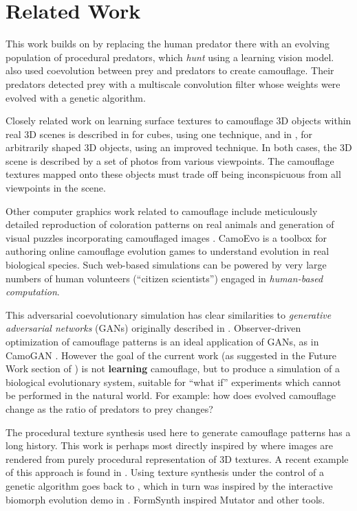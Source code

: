 \documentclass[letterpaper]{article}
\newcommand{\jargon}[1]{\textit{#1}}
\begin{document}
\section{Related Work}
This work builds on \citet{reynolds_iec_2011} by replacing the human predator there with an evolving population of procedural predators, which \jargon{hunt} using a learning vision model. \citet{harrington_coevolution_2014} also used coevolution between prey and predators to create camouflage. Their predators detected prey with a multiscale convolution filter whose weights were evolved with a genetic algorithm.
\par
Closely related work on learning surface textures to camouflage 3D objects within real 3D scenes is described in \citet{owens_camouflaging_2014} for cubes, using one technique, and in \citet{guo_ganmouflage_2022}, for arbitrarily shaped 3D objects, using an improved technique. In both cases, the 3D scene is described by a set of photos from various viewpoints. The camouflage textures mapped onto these objects must trade off being inconspicuous from all viewpoints in the scene.
\par
Other computer graphics work related to camouflage include meticulously detailed reproduction of coloration patterns on real animals \cite{de_gomensoro_malheiros_leopard_2020} and generation of visual puzzles incorporating camouflaged images \cite{chu_camo_image_2010} \cite{Zhang_Yin_Nie_Zheng_2020}. CamoEvo \cite{hancock_camoevo_2022} is a toolbox for authoring online camouflage evolution games to understand evolution in real biological species. Such web-based simulations can be powered by very large numbers of human volunteers (“citizen scientists”) engaged in \jargon{human-based computation}.
\par
This adversarial coevolutionary simulation has clear similarities to \jargon{generative adversarial networks} (GANs) originally described in \citet{goodfellow_gan_2014}. Observer-driven optimization of camouflage patterns is an ideal application of GANs, as in CamoGAN \citet{talas_camogan_2020}. However the goal of the current work (as suggested in the Future Work section of \citet{reynolds_iec_2011}) is not \textbf{learning} camouflage, but to produce a simulation of a biological evolutionary system, suitable for “what if” experiments which cannot be performed in the natural world. For example: how does evolved camouflage change as the ratio of predators to prey changes?
\par
The procedural texture synthesis used here to generate camouflage patterns has a long history. This work is perhaps most directly inspired by \citet{perlin_image_1985} where images are rendered from purely procedural representation of 3D textures. A recent example of this approach is found in \citet{Guerrero_MatFormer_2022}. Using texture synthesis under the control of a genetic algorithm goes back to \citet{sims_artificial_1991}, which in turn was inspired by the interactive biomorph evolution demo in \citet{dawkins_blind_1986}. FormSynth \cite{latham_form_1989} inspired Mutator \cite{todd_evolutionary_1994} and other tools.
\end{document}
